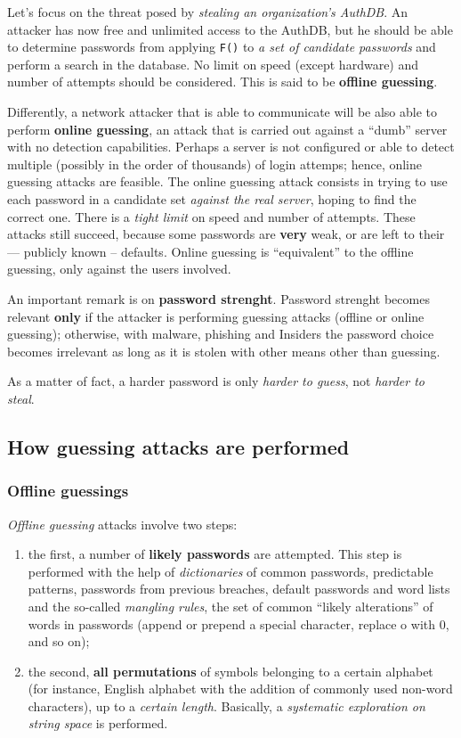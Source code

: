 \documentclass[10pt]{\classname}
\begin{document}
Let's focus on the threat posed by \emph{stealing an organization's AuthDB}. An
attacker has now free and unlimited access to the AuthDB, but he should be able
to determine passwords from applying \texttt{F()} to \emph{a set of candidate
passwords} and perform a search in the database. No limit on speed (except
hardware) and number of attempts should be considered. This is said to be
\textbf{offline guessing}.

Differently, a network attacker that is able to communicate will be also able
to perform \textbf{online guessing}, an attack that is carried out against a
``dumb'' server with no detection capabilities. Perhaps a server is not
configured or able to detect multiple (possibly in the order of thousands) of
login attemps; hence, online guessing attacks are feasible. The online guessing
attack consists in trying to use each password in a candidate set \emph{against
the real server}, hoping to find the correct one. There is a \emph{tight limit}
on speed and number of attempts. These attacks still succeed, because some
passwords are \textbf{very} weak, or are left to their --- publicly known --
defaults. Online guessing is ``equivalent'' to the offline guessing, only
against the users involved.

An important remark is on \textbf{password strenght}. Password strenght becomes
relevant \textbf{only} if the attacker is performing guessing attacks (offline
or online guessing); otherwise, with malware, phishing and Insiders the
password choice becomes irrelevant as long as it is stolen with other means
other than guessing.

As a matter of fact, a harder password is only \emph{harder to guess}, not \emph{harder
to steal}.


\subsection{How guessing attacks are performed}

\subsubsection{Offline guessings}
\emph{Offline guessing} attacks involve two steps:
\begin{enumerate}
    \item the first, a number of \textbf{likely passwords} are attempted. This
        step is performed with the help of \emph{dictionaries} of common
        passwords, predictable patterns, passwords from previous breaches,
        default passwords and word lists and the so\--called \emph{mangling
        rules}, the set of common ``likely alterations'' of words in passwords
        (append or prepend a special character, replace o with 0, and so on);
    \item the second, \textbf{all permutations} of symbols belonging to a
        certain alphabet (for instance, English alphabet with the addition of
        commonly used non\--word characters), up to a \emph{certain length}.
        Basically, a \emph{systematic exploration on string space} is
        performed.
\end{enumerate}
\end{document}
